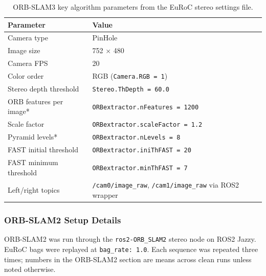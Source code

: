 \documentclass[11pt]{article}
\begin{document}
\begin{table}[H]
\centering
\small
\caption{ORB-SLAM3 key algorithm parameters from the EuRoC stereo settings file.}
\label{tab:orb_algorithm_params}
\begin{tabular}{lp{9.5cm}}
\toprule
Parameter & Value \\
\midrule
Camera type & PinHole \\
Image size & 752 $\times$ 480 \\
Camera FPS & 20 \\
Color order & RGB (\texttt{Camera.RGB = 1}) \\
Stereo depth threshold & \texttt{Stereo.ThDepth = 60.0} \\
ORB features per image* & \texttt{ORBextractor.nFeatures = 1200} \\
Scale factor & \texttt{ORBextractor.scaleFactor = 1.2} \\
Pyramid levels* & \texttt{ORBextractor.nLevels = 8} \\
FAST initial threshold & \texttt{ORBextractor.iniThFAST = 20} \\
FAST minimum threshold & \texttt{ORBextractor.minThFAST = 7} \\
Left/right topics & \texttt{/cam0/image\_raw}, \texttt{/cam1/image\_raw} via ROS2 wrapper \\
\bottomrule
\end{tabular}
\end{table}

\subsubsection{ORB-SLAM2 Setup Details}

ORB-SLAM2 was run through the \texttt{ros2-ORB\_SLAM2} stereo node on ROS2 Jazzy. EuRoC bags were replayed at \texttt{bag\_rate: 1.0}. Each sequence was repeated three times; numbers in the ORB-SLAM2 section are means across clean runs unless noted otherwise.
\end{document}
